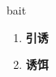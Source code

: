 
\begin{frame}
{\huge bait}
\begin{center}
\begin{enumerate}\Large
  \item \textbf{引诱}
  \item \textbf{诱饵}
\end{enumerate}
\end{center}
\end{frame}

